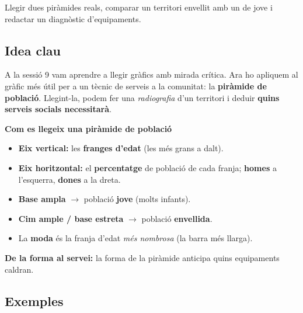%
{Llegir dues piràmides reals, comparar un territori envellit amb un de jove i redactar un diagnòstic d'equipaments.}

\subsection{Idea clau}

A la sessió 9 vam aprendre a llegir gràfics amb mirada crítica. Ara ho apliquem al
gràfic més útil per a un tècnic de serveis a la comunitat: la \textbf{piràmide de
població}. Llegint-la, podem fer una \emph{radiografia} d'un territori i deduir
\textbf{quins serveis socials necessitarà}.

\begin{idea}
\textbf{Com es llegeix una piràmide de població}
\begin{itemize}[leftmargin=1.4em, itemsep=2pt]
  \item \textbf{Eix vertical:} les \textbf{franges d'edat} (les més grans a dalt).
  \item \textbf{Eix horitzontal:} el \textbf{percentatge} de població de cada franja;
        \textbf{homes} a l'esquerra, \textbf{dones} a la dreta.
  \item \textbf{Base ampla} $\rightarrow$ població \textbf{jove} (molts infants).
  \item \textbf{Cim ample / base estreta} $\rightarrow$ població \textbf{envellida}.
  \item La \textbf{moda} és la franja d'edat \emph{més nombrosa} (la barra més llarga).
\end{itemize}
\textbf{De la forma al servei:} la forma de la piràmide anticipa quins equipaments
caldran.
\end{idea}

\subsection{Exemples}

